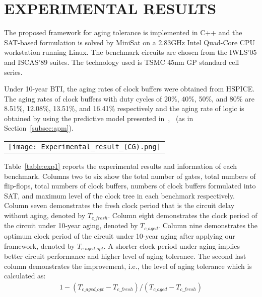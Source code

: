 \section{EXPERIMENTAL RESULTS}
\label{sec:exp}
The proposed framework for aging tolerance is implemented in C++ and the SAT-based formulation is solved by MiniSat on a 2.83GHz Intel Quad-Core CPU workstation running Linux. The benchmark circuits are chosen from the IWLS'05 and ISCAS'89 suites. The technology used is TSMC 45nm GP standard cell series.

Under 10-year BTI, the aging rates of clock buffers were obtained from HSPICE. The aging rates of clock buffers with duty cycles of 20\%, 40\%, 50\%, and 80\% are 8.51\%, 12.08\%, 13.51\%, and 16.41\% respectively and the aging rate of logic is obtained by using the predictive model presented in~\cite{wang2010impact},~\cite{wang2007efficient} (as in Section~\ref{subsec:apm}).

\begin{table*}
\centering
\caption{Results of aging tolerance}
	\begin{tabular}{l}
	\texttt{[image: Experimental\_result\_(CG).png]}
	\end{tabular}
\label{table:exp1}
\end{table*}

Table~\ref{table:exp1} reports the experimental results and information of each benchmark. Columns two to six show the total number of gates, total numbers of flip-flops, total numbers of clock buffers, numbers of clock buffers formulated into SAT, and maximum level of the clock tree in each benchmark respectively. Column seven demonstrates the fresh clock period that is the circuit delay without aging, denoted by $T_{c\_fresh}$. Column eight demonstrates the clock period of the circuit under 10-year aging, denoted by $T_{c\_aged}$. Column nine demonstrates the optimum clock period of the circuit under 10-year aging after applying our framework, denoted by $T_{c\_aged\_opt}$. \iffalse The numbers of inserted DCCs are shown in row two of Table~\ref{table:exp2}.\fi A shorter clock period under aging implies better circuit performance and higher level of aging tolerance. The second last column demonstrates the improvement, i.e., the level of aging tolerance which is calculated as:
\begin{gather*}
1 - (T_{c\_aged\_opt} - T_{c\_fresh}) / (T_{c\_aged} - T_{c\_fresh})
\end{gather*}

